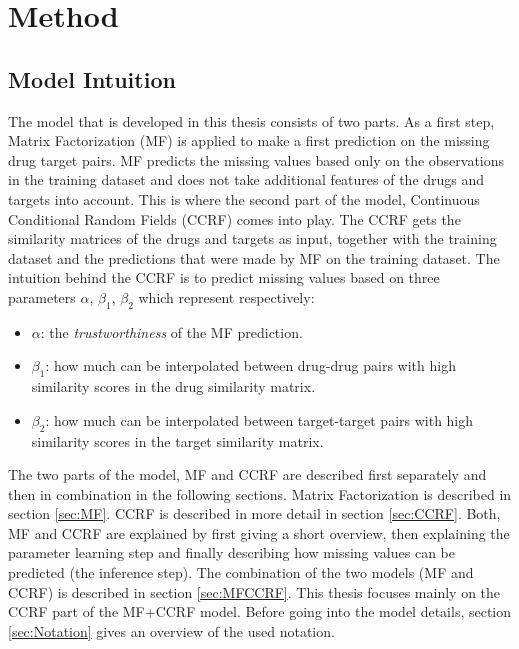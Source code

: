 
\chapter{Method}

\section{Model Intuition}

The model that is developed in this thesis consists of two parts. As a first step, Matrix Factorization (MF) is applied to make a first prediction on the missing drug target pairs. MF predicts the missing values based only on the observations in the training dataset and does not take additional features of the drugs and targets into account. This is where the second part of the model, Continuous Conditional Random Fields (CCRF) comes into play. The CCRF gets the similarity matrices of the drugs and targets as input, together with the training dataset and the predictions that were made by MF on the training dataset. The intuition behind the CCRF is to predict missing values based on three parameters $\alpha$, $\beta_1$, $\beta_2$ which represent respectively:
\begin{itemize}
\item $\alpha$: the \textit{trustworthiness} of the MF prediction. 
\item $\beta_1$: how much can be interpolated between drug-drug pairs with high similarity scores in the drug similarity matrix.
\item $\beta_2$: how much can be interpolated between target-target pairs with high similarity scores in the target similarity matrix.
\end{itemize}

The two parts of the model, MF and CCRF are described first separately and then in combination in the following sections. Matrix Factorization is described in section \ref{sec:MF}. CCRF is described in more detail in section \ref{sec:CCRF}. Both, MF and CCRF are explained by first giving a short overview, then explaining the parameter learning step and finally describing how missing values can be predicted (the inference step).
The combination of the two models (MF and CCRF) is described in section \ref{sec:MFCCRF}. This thesis focuses mainly on the CCRF part of the MF+CCRF model. Before going into the model details, section \ref{sec:Notation} gives an overview of the used notation.

